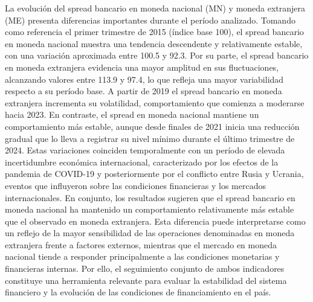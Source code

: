 La evolución del spread bancario en moneda nacional (MN) y moneda extranjera (ME) presenta diferencias importantes durante el período analizado. Tomando como referencia el primer trimestre de 2015 (índice base 100), el spread bancario en moneda nacional muestra una tendencia descendente y relativamente estable, con una variación aproximada entre 100.5 y 92.3. Por su parte, el spread bancario en moneda extranjera evidencia una mayor amplitud en sus fluctuaciones, alcanzando valores entre 113.9 y 97.4, lo que refleja una mayor variabilidad respecto a su período base.
A partir de 2019 el spread bancario en moneda extranjera incrementa su volatilidad, comportamiento que comienza a moderarse hacia 2023. En contraste, el spread en moneda nacional mantiene un comportamiento más estable, aunque desde finales de 2021 inicia una reducción gradual que lo lleva a registrar su nivel mínimo durante el último trimestre de 2024. Estas variaciones coinciden temporalmente con un período de elevada incertidumbre económica internacional, caracterizado por los efectos de la pandemia de COVID-19 y posteriormente por el conflicto entre Rusia y Ucrania, eventos que influyeron sobre las condiciones financieras y los mercados internacionales.
En conjunto, los resultados sugieren que el spread bancario en moneda nacional ha mantenido un comportamiento relativamente más estable que el observado en moneda extranjera. Esta diferencia puede interpretarse como un reflejo de la mayor sensibilidad de las operaciones denominadas en moneda extranjera frente a factores externos, mientras que el mercado en moneda nacional tiende a responder principalmente a las condiciones monetarias y financieras internas. Por ello, el seguimiento conjunto de ambos indicadores constituye una herramienta relevante para evaluar la estabilidad del sistema financiero y la evolución de las condiciones de financiamiento en el país.
